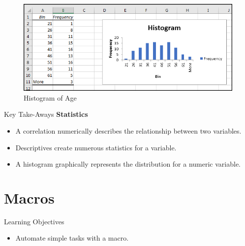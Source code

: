 \begin{figure}[H]
	\centering
	\includegraphics[width=\maxwidth{.95\linewidth}]{gfx/ch09_fig63}
	\caption{Histogram of Age}
	\label{09:fig63}
\end{figure}

\begin{center}
	\begin{tkwbox}{Key Take-Aways}
		\textbf{Statistics}
		\\
		\begin{itemize}
			\setlength{\itemsep}{0pt}
			\setlength{\parskip}{0pt}
			\setlength{\parsep}{0pt}
			
			\item A correlation numerically describes the relationship between two variables.
			\item Descriptives create numerous statistics for a variable.
			\item A histogram graphically represents the distribution for a numeric variable.
			
		\end{itemize}
	\end{tkwbox}
\end{center}

\section{Macros}

\begin{center}
	\begin{objbox}{Learning Objectives}
		\begin{itemize}
			\setlength{\itemsep}{0pt}
			\setlength{\parskip}{0pt}
			\setlength{\parsep}{0pt}
			
			\item Automate simple tasks with a macro.
			
		\end{itemize}
	\end{objbox}
\end{center}

